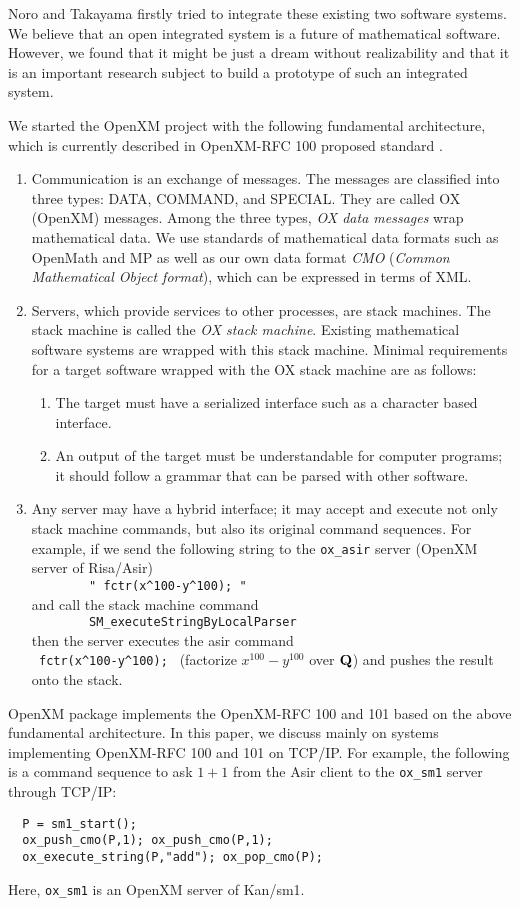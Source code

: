 Noro and Takayama firstly tried to integrate these existing two
software systems.
We believe that an open integrated system is a future of mathematical
software.
However, we found that it might be just a dream without realizability
and that it is an important research subject to
build a prototype of such an integrated system. %

We started the OpenXM project with the following
fundamental architecture, which is currently described in
OpenXM-RFC 100  proposed standard %
\cite{ox-rfc-100}.
\begin{enumerate}
\item Communication is an exchange of messages. The messages are classified into
three types:
DATA, COMMAND, and SPECIAL.
They are called OX (OpenXM) messages.
Among the three types,
{\it OX data messages} wrap mathematical data.
We use standards of mathematical data formats such as OpenMath and MP
as well as our own data format {\it CMO}
({\it Common Mathematical Object format}),
which can be expressed in terms of XML.
\item Servers, which provide services to other processes, are stack machines.
The stack machine is called the
{\it OX stack machine}.
Existing mathematical software systems are wrapped with this stack machine.
Minimal requirements for a target software wrapped with the OX stack machine
are as follows:
\begin{enumerate}
\item The target must have a serialized interface such as a character based
interface.
\item An output of the target must be understandable for computer programs;
it should follow a grammar that can be parsed with other software.
\end{enumerate}
\item Any server may have a hybrid interface;
it may accept and execute not only stack machine commands, 
but also its original command sequences.
For example,
if we send the following string to the {\tt ox\_asir} server 
(OpenXM server of Risa/Asir) \\
\verb+        " fctr(x^100-y^100); "      + \\
and call the stack machine command  \\
\verb+        SM_executeStringByLocalParser    + \\ 
then the server executes the asir command \\
\verb+ fctr(x^100-y^100); + 
(factorize $x^{100}-y^{100}$ over ${\bf Q}$)
and pushes the result onto the stack.
\end{enumerate}
OpenXM package  implements the OpenXM-RFC 100 \cite{ox-rfc-100}
and 101 \cite{ox-rfc-101} based on
the above fundamental architecture.
In this paper, we discuss mainly on systems implementing
OpenXM-RFC 100 and 101 on TCP/IP.
For example, the following is a command sequence to ask $1+1$ from
the Asir client to the {\tt ox\_sm1} server through TCP/IP:
\begin{verbatim}
  P = sm1_start();
  ox_push_cmo(P,1); ox_push_cmo(P,1);
  ox_execute_string(P,"add"); ox_pop_cmo(P);
\end{verbatim}
Here, {\tt ox\_sm1} is an OpenXM server of Kan/sm1.


